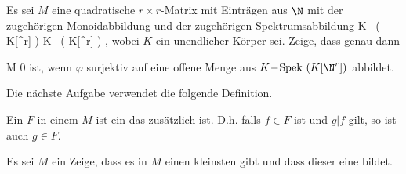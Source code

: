 {}
{





Es sei $M$ eine quadratische $r\times r$-Matrix mit Einträgen aus $\N$ mit der zugehörigen Monoidabbildung und der zugehörigen Spektrumsabbildung
\maabbdisp {\varphi} { K\!-\!\, \left(  K[\N^r]  \right) } { K\!-\!\, \left(  K[\N^r]  \right)
} {,}
wobei $K$ ein unendlicher Körper sei. Zeige, dass  genau dann

\mavergleichskettedisp
{\vergleichskette
{ \det  M
}
{ \neq} { 0
}
{ } {
}
{ } {
}
{ } {
}
}
{}{}{}
ist, wenn $\varphi$ surjektiv auf eine offene Menge aus $K\!-\!\operatorname{Spek}\, \left(  K[\N^r]  \right)$ abbildet.





}
{} {}

Die nächste Aufgabe verwendet die folgende Definition.





Ein  $F$ in einem
$M$ ist ein
das zusätzlich  ist. D.h. falls $f \in F$ ist und $g|f$ gilt, so ist auch $g \in F$.







{}
{





Es sei $M$ ein
Zeige, dass es in $M$ einen kleinsten
gibt und dass dieser eine
bildet.





}
{} {}


